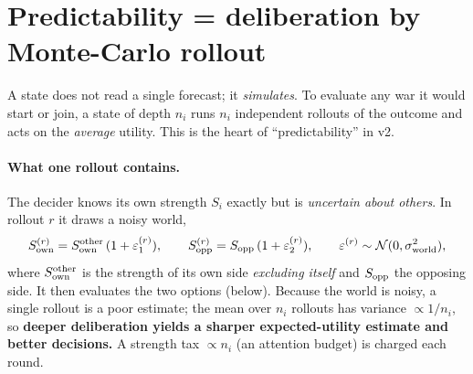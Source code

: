 \documentclass[11pt]{article}
\newcommand{\Sown}{S_{\mathrm{own}}}
\newcommand{\Sopp}{S_{\mathrm{opp}}}
\begin{document}
\section{Predictability = deliberation by Monte-Carlo rollout}\label{sec:rollout}

A state does not read a single forecast; it \emph{simulates}. To evaluate any war
it would start or join, a state of depth $n_i$ runs $n_i$ independent rollouts of
the outcome and acts on the \emph{average} utility. This is the heart of
``predictability'' in v2.

\paragraph{What one rollout contains.} The decider knows its own strength $S_i$
exactly but is \emph{uncertain about others}. In rollout $r$ it draws a noisy
world,
\begin{equation}
\Sown^{(r)}=S_{\rm own}^{\rm other}\,(1+\varepsilon_1^{(r)}),\qquad
\Sopp^{(r)}=S_{\rm opp}\,(1+\varepsilon_2^{(r)}),\qquad
\varepsilon^{(r)}\sim\mathcal N(0,\sigma_{\rm world}^2),
\end{equation}
where $S_{\rm own}^{\rm other}$ is the strength of its own side \emph{excluding
itself} and $S_{\rm opp}$ the opposing side. It then evaluates the two options
(below). Because the world is noisy, a single rollout is a poor estimate; the
mean over $n_i$ rollouts has variance $\propto1/n_i$, so \textbf{deeper
deliberation yields a sharper expected-utility estimate and better decisions.}
A strength tax $\propto n_i$ (an attention budget) is charged each round.
\end{document}
